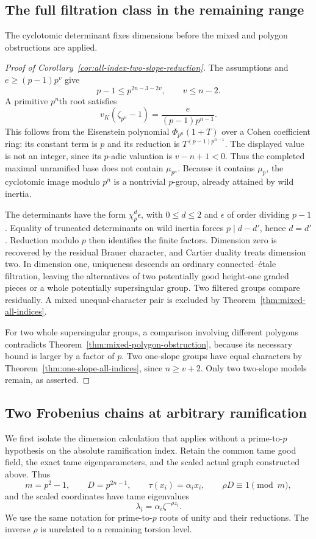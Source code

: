 \subsection{The full filtration class in the remaining range}
The cyclotomic determinant fixes dimensions before the mixed and polygon obstructions are applied.

\begin{proof}[Proof of Corollary~\ref{cor:all-index-two-slope-reduction}]
The assumptions and $e\ge(p-1)p^v$ give
\[
 p-1\le p^{2n-3-2v},\qquad v\le n-2.
\]
A primitive $p^n$th root satisfies
\[
 v_K(\zeta_{p^n}-1)=\frac{e}{(p-1)p^{n-1}}.
\]
This follows from the Eisenstein polynomial $\Phi_{p^n}(1+T)$ over a Cohen coefficient ring: its constant term is $p$ and its reduction is $T^{(p-1)p^{n-1}}$. The displayed value is not an integer, since its $p$-adic valuation is $v-n+1<0$. Thus the completed maximal unramified base does not contain $\mu_{p^n}$. Because it contains $\mu_p$, the cyclotomic image modulo $p^n$ is a nontrivial $p$-group, already attained by wild inertia.

The determinants have the form $\chi_p^d\epsilon$, with $0\le d\le2$ and $\epsilon$ of order dividing $p-1$. Equality of truncated determinants on wild inertia forces $p\mid d-d'$, hence $d=d'$. Reduction modulo $p$ then identifies the finite factors. Dimension zero is recovered by the residual Brauer character, and Cartier duality treats dimension two. In dimension one, uniqueness descends an ordinary connected--\'etale filtration, leaving the alternatives of two potentially good height-one graded pieces or a whole potentially supersingular group. Two filtered groups compare residually. A mixed unequal-character pair is excluded by Theorem~\ref{thm:mixed-all-indices}.

For two whole supersingular groups, a comparison involving different polygons contradicts Theorem~\ref{thm:mixed-polygon-obstruction}, because its necessary bound is larger by a factor of $p$. Two one-slope groups have equal characters by Theorem~\ref{thm:one-slope-all-indices}, since $n\ge v+2$. Only two two-slope models remain, as asserted.
\end{proof}

\subsection{Two Frobenius chains at arbitrary ramification}

We first isolate the dimension calculation that applies without a
prime-to-$p$ hypothesis on the absolute ramification index.  Retain the
common tame good field, the exact tame eigenparameters, and the scaled
actual graph constructed above.  Thus
\[
 m=p^2-1,\qquad D=p^{2n-1},\qquad
 \tau(x_i)=\alpha_i x_i,
 \qquad \rho D\equiv1\pmod m,
\]
and the scaled coordinates have tame eigenvalues
\[
 \lambda_i=\alpha_i\zeta^{-\rho z_i}.
\]
We use the same notation for prime-to-$p$ roots of unity and their
reductions.  The inverse $\rho$ is unrelated to a remaining torsion
level.

